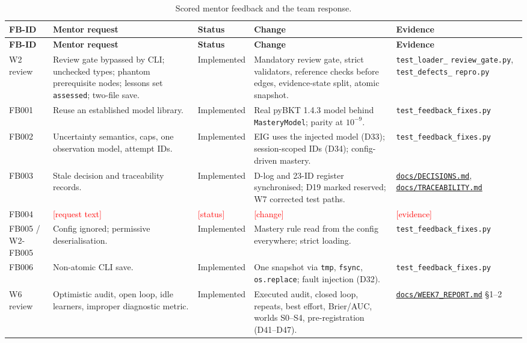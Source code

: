 \documentclass[11pt,a4paper]{article}
\newcommand{\fillin}[1]{\textcolor{red}{[#1]}}
\newcommand{\finaltag}{cs5903-final-2026}
\newcommand{\repobase}{https://github.com/vhemanth06/AdaptEngine}
\newcommand{\repo}[1]{\href{\repobase/blob/\finaltag/#1}{\nolinkurl{#1}}}
\begin{document}
\begin{xltabular}{\textwidth}{
    @{}
    >{\raggedright\arraybackslash}p{0.11\textwidth}
    >{\raggedright\arraybackslash}p{0.22\textwidth}
    >{\raggedright\arraybackslash}p{0.13\textwidth}
    >{\raggedright\arraybackslash}X
    >{\raggedright\arraybackslash}p{0.2\textwidth}
    @{}
}
\caption{Scored mentor feedback and the team response.}
\label{tab:feedback}\\
\toprule
\textbf{FB-ID} & \textbf{Mentor request} & \textbf{Status} & \textbf{Change} & \textbf{Evidence} \\
\midrule
\endfirsthead
\toprule
\textbf{FB-ID} & \textbf{Mentor request} & \textbf{Status} & \textbf{Change} & \textbf{Evidence} \\
\midrule
\endhead
\bottomrule
\endfoot
W2 review & Review gate bypassed by CLI; unchecked types; phantom prerequisite nodes; lessons set \texttt{assessed}; two-file save. & Implemented & Mandatory review gate, strict validators, reference checks before edges, evidence-state split, atomic snapshot. & \texttt{test\_loader\_} \texttt{review\_gate.py}, \texttt{test\_defects\_} \texttt{repro.py} \\
FB001 & Reuse an established model library. & Implemented & Real pyBKT 1.4.3 model behind \texttt{MasteryModel}; parity at $10^{-9}$. & \texttt{test\_feedback\_fixes.py} \\
FB002 & Uncertainty semantics, caps, one observation model, attempt IDs. & Implemented & EIG uses the injected model (D33); session-scoped IDs (D34); config-driven mastery. & \texttt{test\_feedback\_fixes.py} \\
FB003 & Stale decision and traceability records. & Implemented & D-log and 23-ID register synchronised; D19 marked reserved; W7 corrected test paths. & \repo{docs/DECISIONS.md}, \repo{docs/TRACEABILITY.md} \\
FB004 & \fillin{request text} & \fillin{status} & \fillin{change} & \fillin{evidence} \\
FB005 / W2-FB005 & Config ignored; permissive deserialisation. & Implemented & Mastery rule read from the config everywhere; strict loading. & \texttt{test\_feedback\_fixes.py} \\
FB006 & Non-atomic CLI save. & Implemented & One snapshot via \texttt{tmp}, \texttt{fsync}, \texttt{os.replace}; fault injection (D32). & \texttt{test\_feedback\_fixes.py} \\
W6 review & Optimistic audit, open loop, idle learners, improper diagnostic metric. & Implemented & Executed audit, closed loop, repeats, best effort, Brier/AUC, worlds S0--S4, pre-registration (D41--D47). & \repo{docs/WEEK7_REPORT.md} \S1--2 \\
\end{xltabular}
\end{document}
